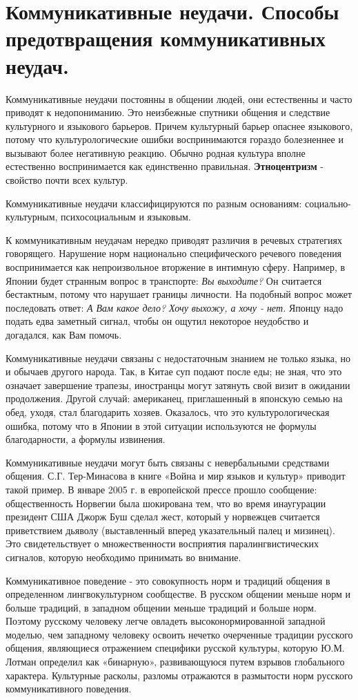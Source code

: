\section{Коммуникативные неудачи. Способы предотвращения коммуникативных неудач.}

Коммуникативные неудачи постоянны в общении людей, они естественны и часто приводят к недопониманию.
Это неизбежные спутники общения и следствие культурного и языкового барьеров.
Причем культурный барьер опаснее языкового, потому что культурологические ошибки воспринимаются гораздо болезненнее и вызывают более негативную реакцию.
Обычно родная культура вполне естественно воспринимается как единственно правильная.
\textbf{Этноцентризм} - свойство почти всех культур.

Коммуникативные неудачи классифицируются по разным основаниям: социально-культурным, психосоциальным и языковым.

К коммуникативным неудачам нередко приводят различия в речевых стратегиях говорящего.
Нарушение норм национально специфического речевого поведения воспринимается как непроизвольное вторжение в интимную сферу.
Например, в Японии будет странным вопрос в транспорте: \textit{Вы выходите?}
Он считается бестактным, потому что нарушает границы личности.
На подобный вопрос может последовать ответ: \textit{А Вам какое дело? Хочу выхожу, а хочу - нет.}
Японцу надо подать едва заметный сигнал, чтобы он ощутил некоторое неудобство и догадался, как Вам помочь.

Коммуникативные неудачи связаны с недостаточным знанием не только языка, но и обычаев другого народа.
Так, в Китае суп подают после еды; не зная, что это означает завершение трапезы, иностранцы могут затянуть свой визит в ожидании продолжения.
Другой случай: американец, приглашенный в японскую семью на обед, уходя, стал благодарить хозяев.
Оказалось, что это культурологическая ошибка, потому что в Японии в этой ситуации используются не формулы благодарности, а формулы извинения.

Коммуникативные неудачи могут быть связаны с невербальными средствами общения.
С.Г. Тер-Минасова в книге «Война и мир языков и культур» приводит такой пример.
В январе 2005 г. в европейской прессе прошло сообщение: общественность Норвегии была шокирована тем, что во время инаугурации президент США Джорж Буш сделал жест, который у норвежцев считается приветствием дьяволу (выставленный вперед указательный палец и мизинец).
Это свидетельствует о множественности восприятия паралингвистических сигналов, которую необходимо принимать во внимание.

Коммуникативное поведение - это совокупность норм и традиций общения в определенном лингвокультурном сообществе.
В русском общении меньше норм и больше традиций, в западном общении меньше традиций и больше норм.
Поэтому русскому человеку легче овладеть высоконормированной западной моделью, чем западному человеку освоить нечетко очерченные традиции русского общения, являющиеся отражением специфики русской культуры, которую Ю.М. Лотман определил как «бинарную», развивающуюся путем взрывов глобального характера.
Культурные расколы, разломы отражаются в размытости норм русского коммуникативного поведения.
